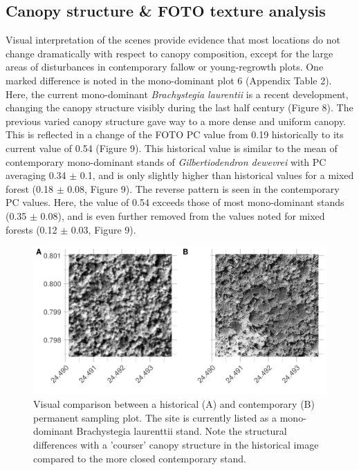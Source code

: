 \documentclass[remote sensing,article,submit,moreauthors,pdftex]{mdpi}
\begin{document}
\hypertarget{canopy-structure-foto-texture-analysis-1}{%
\subsection{Canopy structure \& FOTO texture
analysis}\label{canopy-structure-foto-texture-analysis-1}}

Visual interpretation of the scenes provide evidence that most locations
do not change dramatically with respect to canopy composition, except
for the large areas of disturbances in contemporary fallow or
young-regrowth plots. One marked difference is noted in the
mono-dominant plot 6 (Appendix Table 2). Here, the current mono-dominant
\emph{Brachystegia laurentii} is a recent development, changing the
canopy structure visibly during the last half century (Figure 8). The
previous varied canopy structure gave way to a more dense and uniform
canopy. This is reflected in a change of the FOTO PC value from 0.19
historically to its current value of 0.54 (Figure 9). This historical
value is similar to the mean of contemporary mono-dominant stands of
\emph{Gilbertiodendron dewevrei} with PC averaging 0.34 \(\pm\) 0.1, and
is only slightly higher than historical values for a mixed forest (0.18
\(\pm\) 0.08, Figure 9). The reverse pattern is seen in the contemporary
PC values. Here, the value of 0.54 exceeds those of most mono-dominant
stands (0.35 \(\pm\) 0.08), and is even further removed from the values
noted for mixed forests (0.12 \(\pm\) 0.03, Figure 9).

\begin{figure}

{\centering \includegraphics[width=1\linewidth]{./figures/visual_comparison_psp} 

}

\caption{Visual comparison between a historical (A) and contemporary (B) permanent sampling plot. The site is currently listed as a mono-dominant Brachystegia laurenttii stand. Note the structural differences with a 'courser' canopy structure in the historical image compared to the more closed contemporary stand.}\label{fig:unnamed-chunk-12}
\end{figure}
\end{document}
